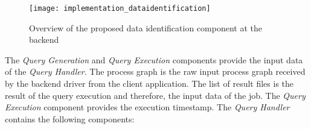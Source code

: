 \documentclass[draft,final]{vutinfth} %
\begin{document}
\begin{figure}[h]
	\centering
	\texttt{[image: implementation\_dataidentification]}
	\caption{Overview of the proposed data identification component at the backend}
	\label{fig:impldataid} %
\end{figure}

The \textit{Query Generation} and \textit{Query Execution} components provide the input data of the \textit{Query Handler}. The process graph is the raw input process graph received by the backend driver from the client application. The list of result files is the result of the query execution and therefore, the input data of the job. The \textit{Query Execution} component provides the execution timestamp. The \textit{Query Handler} contains the following components:
\end{document}
